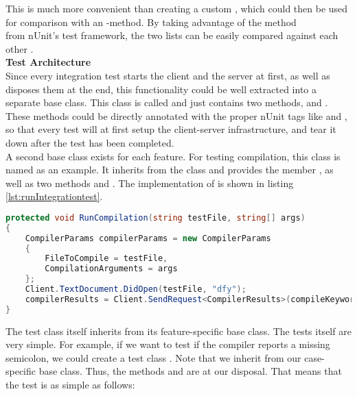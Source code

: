 This is much more convenient than creating a custom , which could then be used for comparison with an -method.
By taking advantage of the method \\
 from nUnit's test framework,
the two lists can be easily compared against each other \cite{nunitCollectionAssert}. \\

\textbf{Test Architecture}\\
Since every integration test starts the client and the server at first, as well as disposes them at the end,
this functionality could be well extracted into a separate base class.
This class is called  and just contains two methods,  and .
These methods could be directly annotated with the proper nUnit tags like \code{[SetUp]} and \code{[TearDown]},
so that every test will at first setup the client-server infrastructure,
and tear it down after the test has been completed.\\

A second base class exists for each feature.
For testing compilation, this class is named  as an example.
It inherits from the  class and provides the member ,
as well as two methods  and .
The implementation of  is shown in listing \ref{lst:runIntegrationtest}.\\

\begin{lstlisting}[language=csharp, caption={Running a Compilation Integration test}, captionpos=b, label={lst:runIntegrationtest}]
protected void RunCompilation(string testFile, string[] args)
{
    CompilerParams compilerParams = new CompilerParams
    {
        FileToCompile = testFile,
        CompilationArguments = args
    };
    Client.TextDocument.DidOpen(testFile, "dfy");
    compilerResults = Client.SendRequest<CompilerResults>(compileKeyword, compilerParams, CancellationSource.Token).Result;
}
\end{lstlisting}


The test class itself inherits from its feature-specific base class.
The tests itself are very simple.
For example, if we want to test if the compiler reports a missing semicolon, we could create a test class .
Note that we inherit from our case-specific base class.
Thus, the methods  and  are at our disposal.
That means that the test is as simple as follows:

